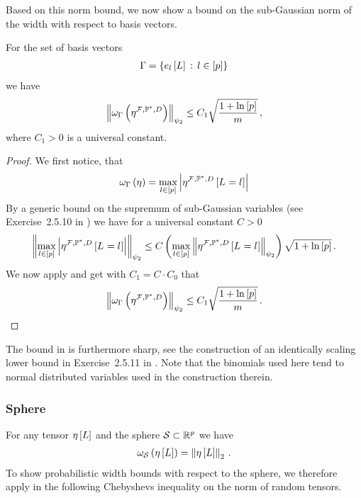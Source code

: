 Based on this norm bound, we now show a bound on the sub-Gaussian norm of the width with respect to basis vectors.

\begin{theorem}
    \label{the:basisTensorWidthBound}
    For the set of basis vectors
    \begin{align*}
        \Gamma = \{e_{l}\left[L\right] \,:\, l\in[p] \}
    \end{align*}
    we have
    \begin{align*}
        \left\|\omega_{\Gamma}\left(\eta^{\mathcal{F},\mathbb{P}^*,D}\right)\right\|_{\psi_2} \leq C_1 \sqrt{\frac{1+\ln \left[ p \right]}{m}} \, ,
    \end{align*}
    where $C_1>0$ is a universal constant.
\end{theorem}
\begin{proof}
    We first notice, that
    \begin{align*}
        \omega_{\Gamma}\left(\eta\right) = \max_{l\in[p]} \left|\eta^{\mathcal{F},\mathbb{P}^*,D}\left[L_{}=l_{}\right]\right|
    \end{align*}
    By a generic bound on the supremum of sub-Gaussian variables (see Exercise~2.5.10 in \cite{vershynin_high-dimensional_2018}) we have for a universal constant $C>0$
    \begin{align*}
        \left\|\max_{l\in[p]}\left|\eta^{\mathcal{F},\mathbb{P}^*,D}\left[L_{}=l_{}\right]\right|\right\|_{\psi_2}
        \leq C \left(\max_{l\in[p]}\left\|\eta^{\mathcal{F},\mathbb{P}^*,D}\left[L_{}=l_{}\right]\right\|_{\psi_2}\right) \sqrt{1 + \ln \left[ p \right]} \, .
    \end{align*}
    We now apply  and get with $C_1=C\cdot C_0$ that
        \begin{align*}
        \left\|\omega_{\Gamma}\left(\eta^{\mathcal{F},\mathbb{P}^*,D}\right)\right\|_{\psi_2} \leq C_1 \sqrt{\frac{1+\ln \left[ p \right]}{m}}  \, .
    \end{align*}
\end{proof}

The bound in  is furthermore sharp, see the construction of an identically scaling lower bound in Exercise~2.5.11 in \cite{vershynin_high-dimensional_2018}.
Note that the binomials used here tend to normal distributed variables used in the construction therein.

\subsubsection{Sphere}

For any tensor $\eta\left[L\right]$ and the sphere $\mathcal{S}\subset\mathbb{R}^{p}$ we have
\begin{align*}
    \omega_{\mathcal{S}}\left(\eta\left[L\right]\right)
    = \left\|\eta\left[L\right]\right\|_{2} \, .
\end{align*}
To show probabilistic width bounds with respect to the sphere, we therefore apply in the following Chebyshevs inequality on the norm of random tensors.

